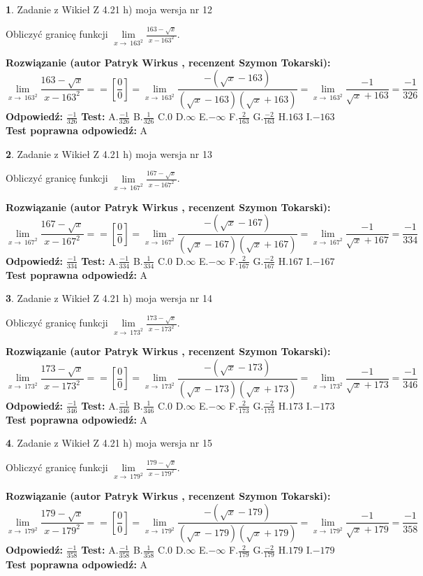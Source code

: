 \documentclass[12pt, a4paper]{article}
\theoremstyle{definition} %
\newtheorem{zad}{}
\newcommand{\zadStart}[1]{\begin{zad}#1\newline}
\newcommand{\zadStop}{\end{zad}}
\newcommand{\rozwStart}[2]{\noindent \textbf{Rozwiązanie (autor #1 , recenzent #2): }\newline}
\newcommand{\rozwStop}{\newline}
\newcommand{\odpStart}{\noindent \textbf{Odpowiedź:}\newline}
\newcommand{\odpStop}{\newline}
\newcommand{\testStart}{\noindent \textbf{Test:}\newline}
\newcommand{\testStop}{\newline}
\newcommand{\kluczStart}{\noindent \textbf{Test poprawna odpowiedź:}\newline}
\newcommand{\kluczStop}{\newline}
\begin{document}
\zadStart{Zadanie z Wikieł Z 4.21 h) moja wersja nr 12}

Obliczyć granicę funkcji $\lim\limits_{x\to\ 163^{2}}\frac{163-\sqrt{x}}{x-163^{2}}$.
\zadStop
\rozwStart{Patryk Wirkus}{Szymon Tokarski}
$$\lim\limits_{x\to\ 163^{2}}\frac{163-\sqrt{x}}{x-163^{2}} = = [\frac{0}{0}] = \lim\limits_{x\to\ 163^{2}}\frac{-(\sqrt{x}-163)}{(\sqrt{x}-163)(\sqrt{x}+163)} = \lim\limits_{x\to\ 163^{2}}\frac{-1}{\sqrt{x}+163} = \frac{-1}{326}$$
\rozwStop
\odpStart
$\frac{-1}{326}$
\odpStop
\testStart
A.$\frac{-1}{326}$ B.$\frac{1}{326}$ C.$0$ D.$\infty$ E.$-\infty$
F.$\frac{2}{163}$ G.$\frac{-2}{163}$
H.$163$
I.$-163$
\testStop
\kluczStart
A
\kluczStop



\zadStart{Zadanie z Wikieł Z 4.21 h) moja wersja nr 13}

Obliczyć granicę funkcji $\lim\limits_{x\to\ 167^{2}}\frac{167-\sqrt{x}}{x-167^{2}}$.
\zadStop
\rozwStart{Patryk Wirkus}{Szymon Tokarski}
$$\lim\limits_{x\to\ 167^{2}}\frac{167-\sqrt{x}}{x-167^{2}} = = [\frac{0}{0}] = \lim\limits_{x\to\ 167^{2}}\frac{-(\sqrt{x}-167)}{(\sqrt{x}-167)(\sqrt{x}+167)} = \lim\limits_{x\to\ 167^{2}}\frac{-1}{\sqrt{x}+167} = \frac{-1}{334}$$
\rozwStop
\odpStart
$\frac{-1}{334}$
\odpStop
\testStart
A.$\frac{-1}{334}$ B.$\frac{1}{334}$ C.$0$ D.$\infty$ E.$-\infty$
F.$\frac{2}{167}$ G.$\frac{-2}{167}$
H.$167$
I.$-167$
\testStop
\kluczStart
A
\kluczStop



\zadStart{Zadanie z Wikieł Z 4.21 h) moja wersja nr 14}

Obliczyć granicę funkcji $\lim\limits_{x\to\ 173^{2}}\frac{173-\sqrt{x}}{x-173^{2}}$.
\zadStop
\rozwStart{Patryk Wirkus}{Szymon Tokarski}
$$\lim\limits_{x\to\ 173^{2}}\frac{173-\sqrt{x}}{x-173^{2}} = = [\frac{0}{0}] = \lim\limits_{x\to\ 173^{2}}\frac{-(\sqrt{x}-173)}{(\sqrt{x}-173)(\sqrt{x}+173)} = \lim\limits_{x\to\ 173^{2}}\frac{-1}{\sqrt{x}+173} = \frac{-1}{346}$$
\rozwStop
\odpStart
$\frac{-1}{346}$
\odpStop
\testStart
A.$\frac{-1}{346}$ B.$\frac{1}{346}$ C.$0$ D.$\infty$ E.$-\infty$
F.$\frac{2}{173}$ G.$\frac{-2}{173}$
H.$173$
I.$-173$
\testStop
\kluczStart
A
\kluczStop



\zadStart{Zadanie z Wikieł Z 4.21 h) moja wersja nr 15}

Obliczyć granicę funkcji $\lim\limits_{x\to\ 179^{2}}\frac{179-\sqrt{x}}{x-179^{2}}$.
\zadStop
\rozwStart{Patryk Wirkus}{Szymon Tokarski}
$$\lim\limits_{x\to\ 179^{2}}\frac{179-\sqrt{x}}{x-179^{2}} = = [\frac{0}{0}] = \lim\limits_{x\to\ 179^{2}}\frac{-(\sqrt{x}-179)}{(\sqrt{x}-179)(\sqrt{x}+179)} = \lim\limits_{x\to\ 179^{2}}\frac{-1}{\sqrt{x}+179} = \frac{-1}{358}$$
\rozwStop
\odpStart
$\frac{-1}{358}$
\odpStop
\testStart
A.$\frac{-1}{358}$ B.$\frac{1}{358}$ C.$0$ D.$\infty$ E.$-\infty$
F.$\frac{2}{179}$ G.$\frac{-2}{179}$
H.$179$
I.$-179$
\testStop
\kluczStart
A
\kluczStop
\end{document}
